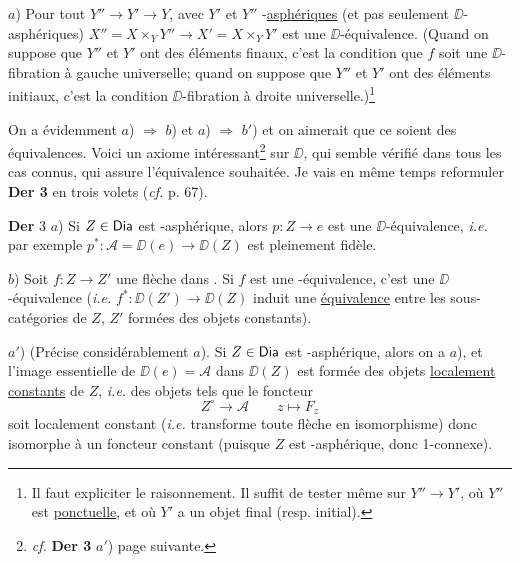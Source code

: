 $a$) Pour tout $Y'' \to Y' \to Y$, avec $Y'$ et $Y''$ \Hot-\underline{asphériques} (et pas seulement $\DD$-asphériques) $X'' = X \times_Y Y'' \to X' = X \times_Y Y'$ est une $\DD$-équivalence. (Quand on suppose que $Y''$ et $Y'$ ont des éléments finaux, c’est la condition que $f$ soit une $\DD$-fibration à gauche universelle; quand on suppose que $Y''$ et $Y'$ ont des éléments initiaux, c’est la condition $\DD$-fibration à droite universelle.)\footnote[48]{Il faut expliciter le raisonnement. Il suffit de tester même sur $Y'' \to Y'$, où $Y''$ est \underline{ponctuelle}, et où $Y'$ a un objet final (resp. initial).}

On a évidemment $a$) $\Rightarrow$ $b$) et $a$) $\Rightarrow$ $b'$) et on aimerait que ce soient des équivalences. Voici un axiome intéressant\footnote[49]{\textit{cf.} \textbf{Der 3} $a'$) page suivante.} sur $\DD$, qui semble vérifié dans tous les cas connus, qui assure l’équivalence souhaitée. Je vais en même temps reformuler \textbf{Der 3} en trois volets (\textit{cf.} p. 67).

\textbf{Der} 3 $a$) Si $Z \in \mathsf{Dia}$ est \Hot-asphérique, alors $p : Z \to e$ est une $\DD$-équivalence, \textit{i.e.} par exemple $p^* : \mathcal{A} = \DD(e) \to \DD(Z)$ est pleinement fidèle.

$b$) Soit $f : Z \to Z'$ une flèche dans \Dia. Si $f$ est une \Hot-équivalence, c’est une $\DD$-équivalence (\textit{i.e.} $f^* : \DD(Z') \to \DD(Z)$ induit une \underline{équivalence} entre les sous-catégories de $Z$, $Z'$ formées des objets constants).

$a'$) (Précise considérablement $a$). Si $Z \in \mathsf{Dia}$ est \Hot-asphérique, alors on a $a$), et l’image essentielle de $\DD(e) = \mathcal{A}$ dans $\DD(Z)$ est formée des objets \underline{localement} \underline{constants} de $Z$, \textit{i.e.} des objets tels que le foncteur
\[
Z^{\circ} \longrightarrow \mathcal{A} \qquad z \longmapsto F_z
\]
soit localement constant (\textit{i.e.} transforme toute flèche en isomorphisme) donc isomorphe à un foncteur constant (puisque $Z$ est \Hot-asphérique, donc 1-connexe).

